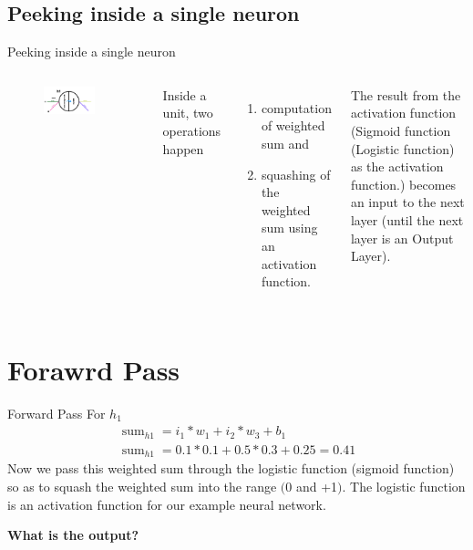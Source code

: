 \documentclass[8pt,dvipsnames]{beamer}
\begin{document}
\subsection{Peeking inside a single neuron}
\begin{frame}{Peeking inside a single neuron}
	\begin{columns}
		\begin{figure}
			\centering
			\includegraphics[width=0.8\textwidth]{imgs/nn_3.png}
		\end{figure}
		Inside a unit, two operations happen
		\begin{enumerate}
			\item computation of weighted sum and 
			\item squashing of the weighted sum using an activation function. 
		\end{enumerate}
		The result from the activation function (Sigmoid function (Logistic function) as the activation function.) becomes an input to the next layer (until the next layer is an Output Layer).
	\end{columns}
\end{frame}

\section{Forawrd Pass}
\begin{frame}{Forward Pass}
	For \(h_1\)
	$$
	\begin{array}{c}\operatorname{sum}_{h 1}=i_{1} * w_{1}+i_{2} * w_{3}+b_{1} \\ \operatorname{sum}_{h 1}=0.1 * 0.1+0.5 * 0.3+0.25=0.41\end{array}
	$$
	Now we pass this weighted sum through the logistic function (sigmoid
	function) so as to squash the weighted sum into the range \((0\) and +1\()\).
	The logistic function is an activation function for our example neural
	network.
	\vspace{1cm}
	
	\centering
	\textbf{What is the output?}
\end{frame}
\end{document}

